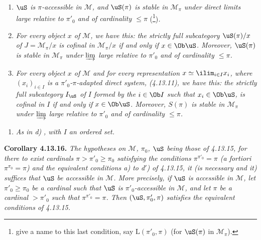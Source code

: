 \begin{enumerate}
\item[a$'$)] \textit{$\uS$ is $\pi$-accessible in $\mathcal{M}$, and $\uS(\pi)$ is stable in $\mathcal{M}_\pi$ under direct limits large relative to $\pi'_0$ and of cardinality $\leqslant \pi$} (\footnote[136]{give a name to this last condition, say $\mathrm{L}(\pi'_0, \pi)$ (for $\uS(\pi)$ in $\mathcal{M}_\pi$).})\textit{.}
\item[b)] \textit{For every object $x$ of $\mathcal{M}$, we have this: the strictly full subcategory $\uS(\pi)/x$ of $J = \mathcal{M}_\pi/x$ is cofinal in $\mathcal{M}_\pi/x$ if and only if $x \in \Ob\uS$. Moreover, $\uS(\pi)$ is stable in $\mathcal{M}_\pi$ under $\varinjlim$ large relative to $\pi'_0$ and of cardinality $\leqslant \pi$.}
\item[\circlabel{c}] \textit{For every object $x$ of $\mathcal{M}$ and for every representation $x \simeq \ilim_{i\in I} x_i$, where $(x_i)_{i\in I}$ is a $\pi'_0$-$\pi$-adapted direct system, (4.13.11), we have this: the strictly full subcategory $I_{\uS}$ of $I$ formed by the $i \in \Ob I$ such that $x_i \in \Ob\uS$, is cofinal in $I$ if and only if $x \in \Ob\uS$. Moreover, $S(\pi)$ is stable in $\mathcal{M}_\pi$ under $\varinjlim$ large relative to $\pi'_0$ and of cardinality $\leqslant \pi$.} %
\end{enumerate}
\begin{enumerate}
\item[c$'$)] \textit{As in d)} \textit{, with $I$ an ordered set.}
\end{enumerate}
\noindent\textbf{Corollary 4.13.16.} \textit{The hypotheses on $\mathcal{M}$, $\pi_0$, $\uS$ being those of 4.13.15, for there to exist cardinals $\pi > \pi'_0 \geqslant \pi_0$ satisfying the conditions $\pi^{\pi'_0} = \pi$ (a fortiori $\pi^{\pi_0} = \pi$) and the equivalent conditions a) to d$'$)} \textit{of 4.13.15, it (is necessary and it) suffices that $\uS$ be accessible in $\mathcal{M}$. More precisely, if $\uS$ is accessible in $\mathcal{M}$, let $\pi'_0 \geqslant \pi_0$ be a cardinal such that $\uS$ is $\pi'_0$-accessible in $\mathcal{M}$, and let $\pi$ be a cardinal $> \pi'_0$ such that $\pi^{\pi'_0} = \pi$. Then $(\uS, \pi'_0, \pi)$ satisfies the equivalent conditions of 4.13.15.}

